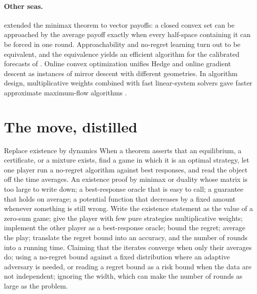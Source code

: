 \begin{refsection}
\paragraph{Other seas.} \textcite{Blackwell1956} extended the minimax theorem to vector payoffs: a closed convex set can be approached by the average payoff exactly when every half-space containing it can be forced in one round. Approachability and no-regret learning turn out to be equivalent, and the equivalence yields an efficient algorithm for the calibrated forecasts of \textcite{FosterVohra1998} \parencite{AbernethyBartlettHazan2011}. Online convex optimization \parencite{Hazan2016} unifies Hedge and online gradient descent as instances of mirror descent with different geometries. In algorithm design, multiplicative weights combined with fast linear-system solvers gave faster approximate maximum-flow algorithms \parencite{ChristianoEtAl2011}.

\section{The move, distilled}\label{sec:regret:distilled}

\begin{move}{Replace existence by dynamics}
 When a theorem asserts that an equilibrium, a certificate, or a mixture exists, find a game in which it is an optimal strategy, let one player run a no-regret algorithm against best responses, and read the object off the time averages.
 An existence proof by minimax or duality whose matrix is too large to write down; a best-response oracle that is easy to call; a guarantee that holds on average; a potential function that decreases by a fixed amount whenever something is still wrong.
 Write the existence statement as the value of a zero-sum game; give the player with few pure strategies multiplicative weights; implement the other player as a best-response oracle; bound the regret; average the play; translate the regret bound into an accuracy, and the number of rounds into a running time.
 Claiming that the iterates converge when only their averages do; using a no-regret bound against a fixed distribution where an adaptive adversary is needed, or reading a regret bound as a risk bound when the data are not independent; ignoring the width, which can make the number of rounds as large as the problem.
\end{move}


\end{refsection}

